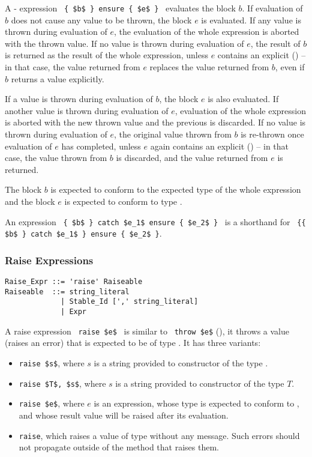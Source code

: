 A - expression ~\lstinline!{ $b$ } ensure { $e$ }!~ evaluates the block $b$. If evaluation of $b$ does not cause any value to be thrown, the block $e$ is evaluated. If any value is thrown during evaluation of $e$, the evaluation of the whole expression is aborted with the thrown value. If no value is thrown during evaluation of $e$, the result of $b$ is returned as the result of the whole expression, unless $e$ contains an explicit  () -- in that case, the value returned from $e$ replaces the value returned from $b$, even if $b$ returns a value explicitly. 

If a value is thrown during evaluation of $b$, the  block $e$ is also evaluated. If another value is thrown during evaluation of $e$, evaluation of the whole expression is aborted with the new thrown value and the previous is discarded. If no value is thrown during evaluation of $e$, the original value thrown from $b$ is re-thrown once evaluation of $e$ has completed, unless $e$ again contains an explicit  () -- in that case, the value thrown from $b$ is discarded, and the value returned from $e$ is returned. 


The block $b$ is expected to conform to the expected type of the whole expression and the  block $e$ is expected to conform to type . 

An expression ~\lstinline!{ $b$ } catch $e_1$ ensure { $e_2$ }!~ is a shorthand for ~\lstinline!{{ $b$ } catch $e_1$ } ensure { $e_2$ }!. 





\subsubsection{Raise Expressions}

\syntax\begin{lstlisting}
Raise_Expr ::= 'raise' Raiseable
Raiseable  ::= string_literal
             | Stable_Id [',' string_literal]
             | Expr
\end{lstlisting}

A raise expression ~\lstinline!raise $e$!~ is similar to ~\lstinline!throw $e$! (), it throws a value (raises an error) that is expected to be of type . It has three variants: 
\begin{itemize}
\item[] \lstinline!raise $s$!, where $s$ is a string provided to constructor of the type . 
\item[] \lstinline!raise $T$, $s$!, where $s$ is a string provided to constructor of the type $T$. 
\item[] \lstinline!raise $e$!, where $e$ is an expression, whose type is expected to conform to , and whose result value will be raised after its evaluation. 
\item[] \lstinline!raise!, which raises a value of type  without any message. Such errors should not propagate outside of the method that raises them. 
\end{itemize}

